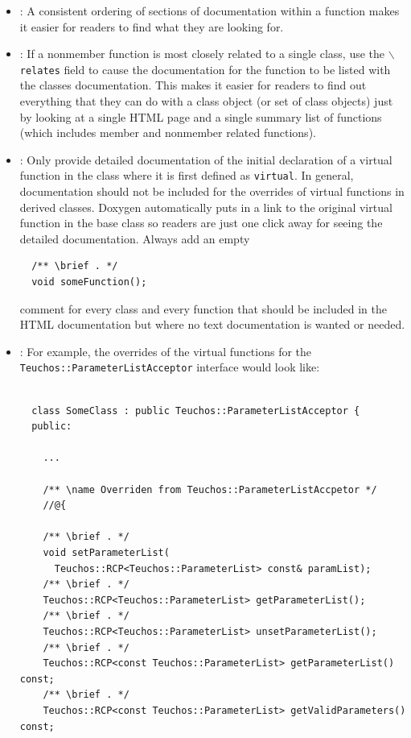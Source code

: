 \begin{itemize}
{}\item\DOXOrderOfDocFieds: A consistent ordering of sections of documentation
within a function makes it easier for readers to find what they are looking
for.

{}\item\DOXUseRelatesForNonmemberFunctions: If a nonmember function is most
closely related to a single class, use the {}\texttt{$\backslash$relates}
field to cause the documentation for the function to be listed with the
classes documentation.  This makes it easier for readers to find out
everything that they can do with a class object (or set of class objects) just
by looking at a single HTML page and a single summary list of functions (which
includes member and nonmember related functions).

{}\item\DOXDocumentInitialVirtualOnly: Only provide detailed documentation of
the initial declaration of a virtual function in the class where it is first
defined as {}\texttt{virtual}.  In general, documentation should not be
included for the overrides of virtual functions in derived classes.  Doxygen
automatically puts in a link to the original virtual function in the base
class so readers are just one click away for seeing the detailed
documentation.  Always add an empty
%
{\small\begin{verbatim}
  /** \brief . */
  void someFunction();
\end{verbatim}}
%
comment for every class and every function that should be included in the HTML
documentation but where no text documentation is wanted or needed.

{}\item\DOXAggregateOverrides: For example, the overrides of the virtual
functions for the {}\texttt{Teuchos\-::Parameter\-List\-Acceptor} interface
would look like:

{\small\begin{verbatim}

  class SomeClass : public Teuchos::ParameterListAcceptor {
  public:

    ...

    /** \name Overriden from Teuchos::ParameterListAccpetor */
    //@{

    /** \brief . */
    void setParameterList(
      Teuchos::RCP<Teuchos::ParameterList> const& paramList);
    /** \brief . */
    Teuchos::RCP<Teuchos::ParameterList> getParameterList();
    /** \brief . */
    Teuchos::RCP<Teuchos::ParameterList> unsetParameterList();
    /** \brief . */
    Teuchos::RCP<const Teuchos::ParameterList> getParameterList() const;
    /** \brief . */
    Teuchos::RCP<const Teuchos::ParameterList> getValidParameters() const;


\end{verbatim}}
\end{itemize}
